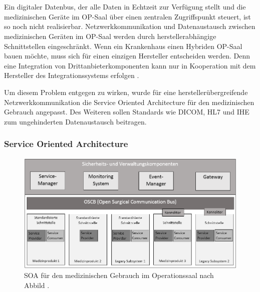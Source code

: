 \chapter{}
\label{sec:overview}

Ein digitaler Datenbus, der alle Daten in Echtzeit zur Verfügung stellt und die medizinischen Geräte im OP-Saal über einen zentralen Zugriffspunkt steuert, ist so noch nicht realisierbar. Netzwerkkommunikation und Datenaustausch zwischen medizinischen Geräten im OP-Saal werden durch herstellerabhängige Schnittstellen eingeschränkt. Wenn ein Krankenhaus einen Hybriden OP-Saal bauen möchte, muss sich für einen einzigen Hersteller entscheiden werden. Denn \glqq eine Integration von Drittanbieterkomponenten kann nur in Kooperation mit dem Hersteller des Integrationssystems erfolgen\grqq{} \cite{DerDigitaleOperationssaal}.

Um diesem Problem entgegen zu wirken, wurde für eine herstellerübergreifende Netzwerkkommunikation die Service Oriented Architecture für den medizinischen Gebrauch angepasst. Des Weiteren sollen Standards wie DICOM, HL7 und IHE zum ungehinderten Datenaustausch beitragen.

\subsection{Service Oriented Architecture}

\begin{figure} [H]
	\includegraphics[scale = 0.6]{Content/Pictures/soa-red.png}
	\caption{SOA für den medizinischen Gebrauch im Operationssaal nach Abbild \cite{DerDigitaleOperationssaal}.}
	\label{fig:soa}
\end{figure}

